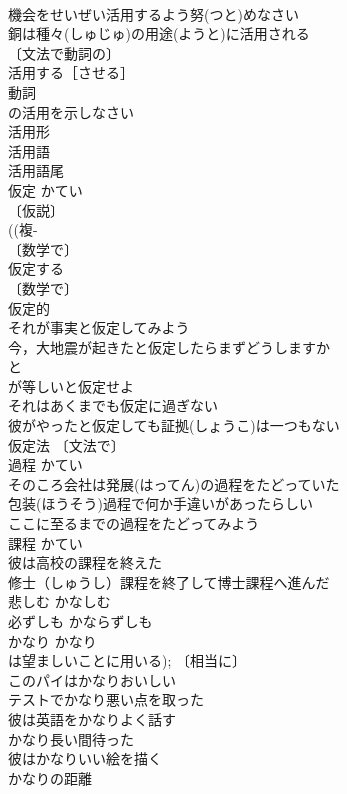\documentclass[8pt]{extreport}
\begin{document}
\begin{CJK}{UTF8}{min}
\\	機会をせいぜい活用するよう努(つと)めなさい 
\\	銅は種々(しゅじゅ)の用途(ようと)に活用される 
\\	〔文法で動詞の〕
\\	活用する［させる］ 
\\	動詞 
\\	の活用を示しなさい 
\\	活用形 
\\	活用語 
\\	活用語尾 
\\	仮定	かてい	
\\	〔仮説〕
\\	((複-
\\	〔数学で〕
\\	仮定する 
\\	〔数学で〕
\\	仮定的 
\\	それが事実と仮定してみよう 
\\	今，大地震が起きたと仮定したらまずどうしますか 
\\	と
\\	が等しいと仮定せよ 
\\	それはあくまでも仮定に過ぎない 
\\	彼がやったと仮定しても証拠(しょうこ)は一つもない 
\\	仮定法 〔文法で〕
\\	過程	かてい	
\\	そのころ会社は発展(はってん)の過程をたどっていた 
\\	包装(ほうそう)過程で何か手違いがあったらしい 
\\	ここに至るまでの過程をたどってみよう 
\\	課程	かてい	
\\	彼は高校の課程を終えた 
\\	修士（しゅうし）課程を終了して博士課程へ進んだ 
\\	悲しむ	かなしむ	
\\	必ずしも	かならずしも	
\\	かなり	かなり	
\\	は望ましいことに用いる); 〔相当に〕
\\	このパイはかなりおいしい 
\\	テストでかなり悪い点を取った 
\\	彼は英語をかなりよく話す 
\\	かなり長い間待った 
\\	彼はかなりいい絵を描く 
\\	かなりの距離 

\end{CJK}
\end{document}
